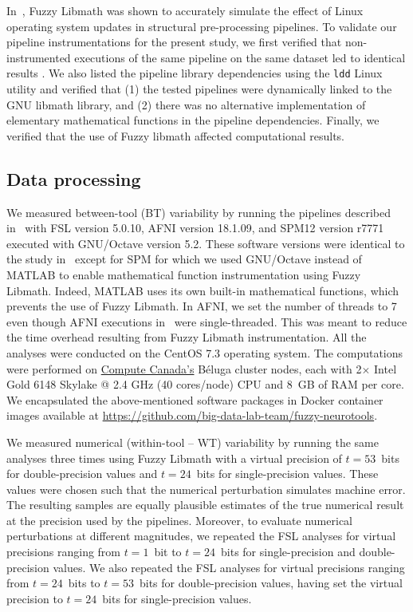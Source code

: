 \documentclass[conference]{IEEEtran}
\begin{document}
In~\cite{salari2021accurate}, Fuzzy Libmath was shown to accurately
simulate the effect of Linux operating system updates in structural
pre-processing pipelines. To validate our pipeline instrumentations for the present study, we first verified that non-instrumented
executions of the same pipeline on the same dataset led to identical
results . We also listed the pipeline
library dependencies using the \texttt{ldd} Linux utility and verified that
(1) the tested pipelines were dynamically linked to the GNU libmath library, and 
(2) there was no alternative implementation of elementary mathematical functions in the pipeline dependencies.
Finally, we verified that the use of Fuzzy libmath affected computational results.

\subsection{Data processing}

We measured between-tool (BT) variability by running the pipelines
described in~\cite{bowring2019exploring} with FSL version 5.0.10, AFNI
version 18.1.09, and SPM12 version r7771 executed with GNU/Octave version
5.2. These software versions were identical to the study
in~\cite{bowring2019exploring} except for SPM for which we used GNU/Octave
instead of MATLAB to enable mathematical function instrumentation using
Fuzzy Libmath. Indeed, MATLAB uses its own built-in mathematical functions,
which prevents the use of Fuzzy Libmath. In AFNI, we set the number of
threads to 7 even though AFNI executions
in~\cite{bowring2019exploring} were single-threaded. This was meant to
reduce the time overhead resulting from Fuzzy Libmath instrumentation. All
the analyses were conducted on the CentOS 7.3 operating system. The
computations were performed on \href{https://www.computecanada.ca}{Compute
Canada's} Béluga cluster nodes, each with 2$\times$ Intel Gold 6148 Skylake
@ 2.4 GHz (40 cores/node) CPU and 8~GB of RAM per core. We encapsulated the
above-mentioned software packages in Docker container images available at
\url{https://github.com/big-data-lab-team/fuzzy-neurotools}.

We measured numerical (within-tool -- WT) variability by running the same analyses three
times using Fuzzy Libmath with a virtual precision of $t=53$~bits for
double-precision values and $t=24$~bits for single-precision values. These
values were chosen such that the numerical perturbation simulates machine
error. The resulting samples are equally plausible estimates of
the true numerical result at the precision used by the pipelines. Moreover, to evaluate numerical perturbations at different magnitudes, 
we repeated the FSL analyses for virtual
precisions ranging from $t=1$~bit to $t=24$~bits for single-precision
and double-precision values. We also repeated the FSL analyses for virtual 
precisions ranging from $t=24$~bits to $t=53$~bits for double-precision values, having 
set the virtual precision to $t=24$~bits for single-precision values. 
\end{document}
